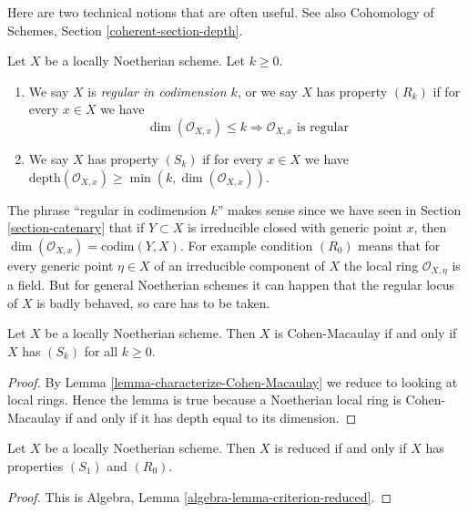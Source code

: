 \noindent
Here are two technical notions that are often useful.
See also Cohomology of Schemes, Section \ref{coherent-section-depth}.

\begin{definition}
\label{definition-Rk}
Let $X$ be a locally Noetherian scheme. Let $k \geq 0$.
\begin{enumerate}
\item We say $X$ is {\it regular in codimension $k$},
or we say $X$ has property {\it $(R_k)$} if for every $x \in X$
we have
$$
\dim(\mathcal{O}_{X, x}) \leq k
\Rightarrow
\mathcal{O}_{X, x}\text{ is regular}
$$
\item We say $X$ has property {\it $(S_k)$} if for every $x \in X$ we have
$\text{depth}(\mathcal{O}_{X, x}) \geq \min(k, \dim(\mathcal{O}_{X, x}))$.
\end{enumerate}
\end{definition}

\noindent
The phrase ``regular in codimension $k$'' makes sense since we have seen
in Section \ref{section-catenary} that if $Y \subset X$ is irreducible
closed with generic point $x$, then
$\dim(\mathcal{O}_{X, x}) = \text{codim}(Y, X)$. For example condition
$(R_0)$ means that for every generic point $\eta \in X$ of an irreducible
component of $X$ the local ring $\mathcal{O}_{X, \eta}$ is a field.
But for general Noetherian schemes it can happen that the regular locus
of $X$ is badly behaved, so care has to be taken.

\begin{lemma}
\label{lemma-scheme-CM-iff-all-Sk}
Let $X$ be a locally Noetherian scheme.
Then $X$ is Cohen-Macaulay if and only if $X$ has $(S_k)$ for all $k \geq 0$.
\end{lemma}

\begin{proof}
By Lemma \ref{lemma-characterize-Cohen-Macaulay}
we reduce to looking at local rings.
Hence the lemma is true because a Noetherian local ring is Cohen-Macaulay
if and only if it has depth equal to its dimension.
\end{proof}

\begin{lemma}
\label{lemma-criterion-reduced}
Let $X$ be a locally Noetherian scheme.
Then $X$ is reduced if and only if $X$ has properties $(S_1)$ and $(R_0)$.
\end{lemma}

\begin{proof}
This is Algebra, Lemma \ref{algebra-lemma-criterion-reduced}.
\end{proof}

